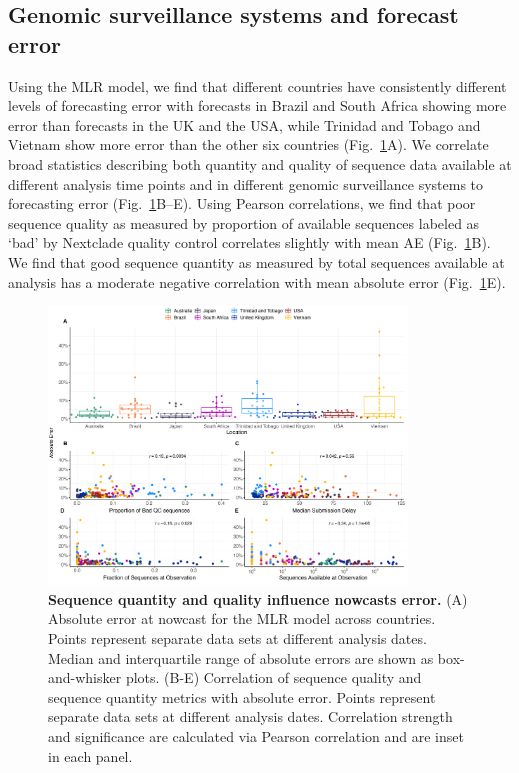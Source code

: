 \subsection*{Genomic surveillance systems and forecast error}

Using the MLR model, we find that different countries have consistently different levels of forecasting error with forecasts in Brazil and South Africa showing more error than forecasts in the UK and the USA, while Trinidad and Tobago and Vietnam show more error than the other six countries (Fig.~\ref{fig:Fig5}A).
We correlate broad statistics describing both quantity and quality of sequence data available at different analysis time points and in different genomic surveillance systems to forecasting error (Fig.~\ref{fig:Fig5}B--E).
Using Pearson correlations, we find that poor sequence quality as measured by proportion of available sequences labeled as `bad' by Nextclade quality control \cite{aksamentov2021nextclade} correlates slightly with mean AE (Fig.~\ref{fig:Fig5}B).
We find that good sequence quantity as measured by total sequences available at analysis has a moderate negative correlation with mean absolute error (Fig.~\ref{fig:Fig5}E).

\begin{figure}[tb!]
	\centering
    \includegraphics[width=0.85\textwidth]{figures/Var_of_interest.png}
    \caption[\textbf{Sequence quantity and quality influence nowcasts error.}]{
		\textbf{Sequence quantity and quality influence nowcasts error.}
		(A) Absolute error at nowcast for the MLR model across countries.
		Points represent separate data sets at different analysis dates.
		Median and interquartile range of absolute errors are shown as box-and-whisker plots.
		(B-E) Correlation of sequence quality and sequence quantity metrics with absolute error.
		Points represent separate data sets at different analysis dates.
    Correlation strength and significance are calculated via Pearson correlation and are inset in each panel.
	}
	\label{fig:Fig5}
\end{figure}

